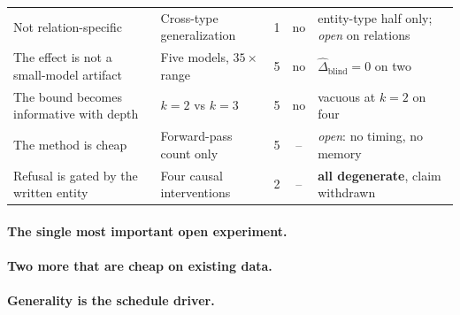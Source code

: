 \documentclass{article}
\newif\ifredflags
\newcommand{\rf}[1]{\ifredflags{\textcolor{red}{\textbf{[MISSING: #1]}}}\fi}
\newcommand{\bridge}{\mathbf{B}}
\begin{document}
\begin{center}
{\begin{tabular}{@{}p{5.1cm}p{4.3cm}ccp{3.1cm}@{}}
\addlinespace[2pt]
Not relation-specific & Cross-type generalization & 1 & no & entity-type half only; \emph{open} on relations\\
\addlinespace[2pt]
The effect is not a small-model artifact & Five models, $35\times$ range & 5 & no & $\widehat{\Delta}_{\mathrm{blind}}{=}0$ on two\\
\addlinespace[2pt]
The bound becomes informative with depth & $k{=}2$ vs $k{=}3$ & 5 & no & vacuous at $k{=}2$ on four\\
\addlinespace[2pt]
The method is cheap & Forward-pass count only & 5 & -- & \emph{open}: no timing, no memory\\
\addlinespace[2pt]
Refusal is gated by the written entity & Four causal interventions & 2 & -- & \textbf{all degenerate}, claim withdrawn\\
\bottomrule
\end{tabular}}
\end{center}

\paragraph{The single most important open experiment.} \rf{a \textbf{bridge-only} arm: score with
$g_{\bridge}$ alone and report it next to BGR-min in Table~\ref{tab:bgr}. Every claim about the
\emph{conjunction} rests on it. If $g_{\bridge}$ alone reaches roughly BGR-min's $0.766$, the finding
is ``read at a different position,'' the minimum contributes nothing, and Section~\ref{sec:bgr}'s
motivation is wrong. If it lands well below and the minimum recovers the difference, the conjunction
is doing the work. This is one line of analysis code on data already collected, it is the cheapest
experiment in this table, and it can falsify the method's design rationale.}

\paragraph{Two more that are cheap on existing data.} \rf{a risk-coverage curve for the surface gate,
BGR-min, and the strongest baseline on the $n{=}239$ set. The paper's central object is selective risk
at a coverage and it currently reports only three points from that curve.} \rf{a failure analysis:
sample the composed items where BGR-min answers and is wrong, and where it abstains and would have
been right, and report what distinguishes them. There is no qualitative analysis in the paper at all.}

\paragraph{Generality is the schedule driver.} \rf{at least six composable relation pairs, screened
for bridge guessability with the procedure of \citet{yang2024shortcuts}. The released two-hop set uses
\emph{place of birth $\to$ country}, which is one of exactly two relations that paper filters out
because the bridge is inferable from the head entity's surface form. Every availability number in this
paper is currently a number about that one relation, and the $\hat v=0.400$ shortcut rate is what that
looks like from the inside.}
\end{document}
